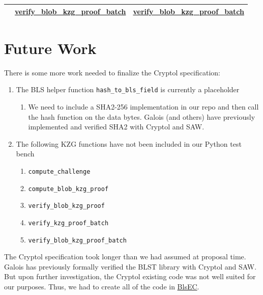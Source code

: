 \documentclass[12pt]{galois-whitepaper}
\begin{document}
\begin{table}
\begin{center}
\begin{tabular}{ |c|c|c| }
            & \href{https://github.com/ethereum/consensus-specs/blob/68d32accf945a84f69d4c779cb6c71223a311eac/specs/deneb/polynomial-commitments.md\#verify_blob_kzg_proof_batch}{verify\_blob\_kzg\_proof\_batch}
            & \href{https://github.com/GaloisInc/ckzg-eip-4844-verification/blob/be7f8802aac340da5b4db3ca5709fd74516ec24b/spec/Spec/KZG.cry\#L155}{verify\_blob\_kzg\_proof\_batch}\\
        \hline
    \end{tabular}
\end{center}
\end{table}


\clearpage

\section{Future Work}

There is some more work needed to finalize the Cryptol specification:
\begin{enumerate}
    \item The BLS helper function \texttt{hash\_to\_bls\_field} is currently a placeholder
          \begin{enumerate}
                \item We need to include a SHA2-256 implementation in our repo and then call the hash function on the data bytes.
                      Galois (and others) have previously implemented and verified SHA2 with Cryptol and SAW.
          \end{enumerate}
    \item The following KZG functions have not been included in our Python test bench
          \begin{enumerate}
                \item \texttt{compute\_challenge}
                \item \texttt{compute\_blob\_kzg\_proof}
                \item \texttt{verify\_blob\_kzg\_proof}
                \item \texttt{verify\_kzg\_proof\_batch}
                \item \texttt{verify\_blob\_kzg\_proof\_batch}
          \end{enumerate}
\end{enumerate}

The Cryptol specification took longer than we had assumed at proposal time.
Galois has previously formally verified the BLST library with Cryptol and SAW.
But upon further investigation, the Cryptol existing code was not well suited for
our purposes. Thus, we had to create all of the code in
\href{https://github.com/GaloisInc/ckzg-eip-4844-verification/tree/main/spec/Spec/BlsEC}{BlsEC}.
\end{document}

